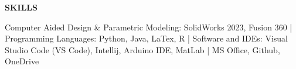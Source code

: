 \documentclass[18pt]{article}
\begin{document}


%
  


\vspace{-0.75\baselineskip}
\begin{center}
    \textbf{SKILLS}
    \hrulefill
\end{center}
\vspace{-0.75\baselineskip}


\justify Computer Aided Design \& Parametric Modeling: SolidWorks 2023, Fusion 360 | Programming Languages: Python, Java, LaTex, R | Software and IDEs: Visual Studio Code (VS Code), Intellij, Arduino IDE, MatLab | MS Office, Github, OneDrive
\end{document}
